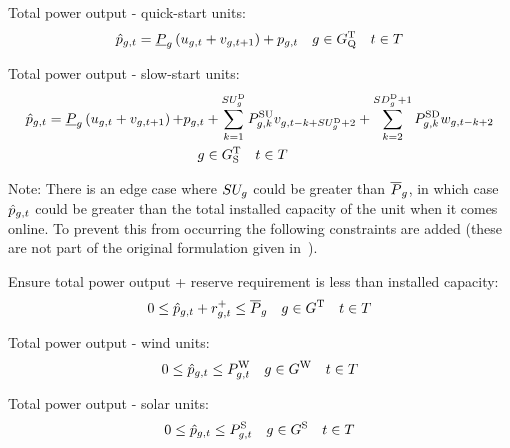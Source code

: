 \documentclass{article}
\begin{document}
Total power output - quick-start units:
\begin{equation}
\vPowerTotal = \cPowerOutputMin \left(\vOnIndicator + \vStartupIndicator[\iGenerator,\iInterval+1]\right) + \vPower \quad  \iGenerator \in \sGeneratorsThermalQuickStart  \quad  \iInterval \in \sIntervals
\end{equation}

Total power output - slow-start units:
\begin{align}
\begin{split}
\vPowerTotal =  \cPowerOutputMin \left(\vOnIndicator + \vStartupIndicator[\iGenerator,\iInterval+1]\right) + & \vPower + \sum\limits_{\iIntervalAlias=1}^{\cStartupDuration} \cStartupTrajectory \vStartupIndicator[\iGenerator,\iInterval-\iIntervalAlias+\cStartupDuration+2] + \sum\limits_{\iIntervalAlias=2}^{\cShutdownDuration + 1} \cShutdownTrajectory \vShutdownIndicator[\iGenerator,\iInterval-\iIntervalAlias+2]\\
& \quad  \iGenerator \in \sGeneratorsThermalSlowStart  \quad  \iInterval \in \sIntervals
\end{split}
\end{align}

Note: There is an edge case where $\cRampRateStartup$ could be greater than $\cPowerOutputMax$, in which case $\vPowerTotal$ could be greater than the total installed capacity of the unit when it comes online. To prevent this from occurring the following constraints are added (these are not part of the original formulation given in~\cite{morales-espana_tight_2015}).

Ensure total power output + reserve requirement is less than installed capacity:
\begin{equation}
	0 \leq \vPowerTotal + \vReserveUp \leq \cPowerOutputMax[\iGenerator] \quad  \iGenerator \in \sGeneratorsThermal  \quad  \iInterval \in \sIntervals
\end{equation}

Total power output - wind units:
\begin{equation}
0 \leq \vPowerTotal \leq \cPowerOutputWind \quad  \iGenerator \in \sGeneratorsWind  \quad  \iInterval \in \sIntervals 
\end{equation}

Total power output - solar units:
\begin{equation}
0 \leq \vPowerTotal \leq \cPowerOutputSolar \quad  \iGenerator \in \sGeneratorsSolar  \quad  \iInterval \in \sIntervals 
\end{equation}
\end{document}
